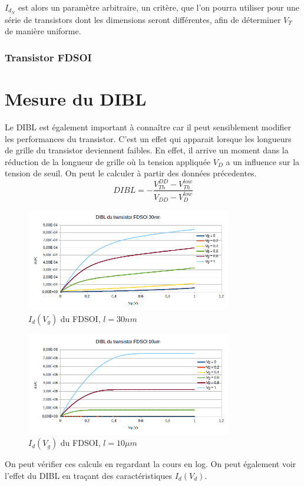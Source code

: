 \documentclass[a4paper,11pt]{report}
\begin{document}
$I_{d_{N}}$ est alors un paramètre arbitraire, un critère, que l'on pourra utiliser pour une série de transistors dont les dimensions seront différentes, afin de déterminer $V_T$ de manière uniforme.


\subsection{Transistor FDSOI}


\chapter{Mesure du DIBL}
Le DIBL est également important à connaître car il peut sensiblement modifier les performances du transistor. C'est un effet qui apparait lorsque les  longueurs de grille du transistor deviennent faibles. En effet, il arrive un moment dans la réduction de la longueur de grille où la tension appliquée $V_D$ a un influence sur la tension de seuil. 
On peut le calculer à partir des données précedentes.
\[ DIBL = -\frac{V^{DD}_{Th} - V^{low}_{Th}}{V_{DD} - V^{low}_{D}}
\]

\begin{figure}[h]
    \begin{center}
        \includegraphics[width=0.8\textwidth]{Images/DIBL-11-30}
        \caption{$I_d(V_g)$ du FDSOI, $l = 30nm$}
        \label{DIBL_fdsoi_30nm}
    \end{center}
\end{figure}


\begin{figure}[h]
    \begin{center}
        \includegraphics[width=0.8\textwidth]{Images/DIBL-1-10}
        \caption{$I_d(V_g)$ du FDSOI, $l =10\mu m$}
        \label{DIBL_fdsoi_10um}
    \end{center}
\end{figure}
On peut vérifier ces calculs en regardant la cours en log.
On peut également voir l'effet du DIBL en traçant des caractéristiques $I_d(V_d)$.
\end{document}

